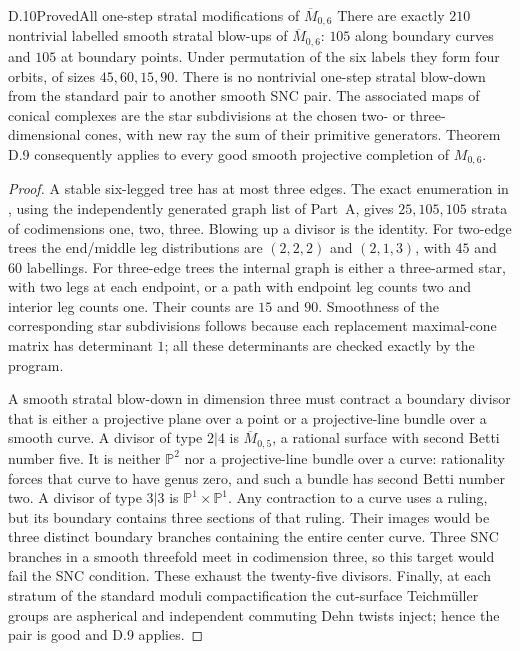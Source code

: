 \begin{result}{D.10}{Proved}{All one-step stratal modifications of $\overline M_{0,6}$}
There are exactly $210$ nontrivial labelled smooth stratal blow-ups of $\overline M_{0,6}$: $105$ along boundary curves and $105$ at boundary points. Under permutation of the six labels they form four orbits, of sizes $45,60,15,90$. There is no nontrivial one-step stratal blow-down from the standard pair to another smooth SNC pair. The associated maps of conical complexes are the star subdivisions at the chosen two- or three-dimensional cones, with new ray the sum of their primitive generators. Theorem D.9 consequently applies to every good smooth projective completion of $M_{0,6}$.
\end{result}
\begin{proof}
A stable six-legged tree has at most three edges. The exact enumeration in , using the independently generated graph list of Part~A, gives $25,105,105$ strata of codimensions one, two, three. Blowing up a divisor is the identity. For two-edge trees the end/middle leg distributions are $(2,2,2)$ and $(2,1,3)$, with $45$ and $60$ labellings. For three-edge trees the internal graph is either a three-armed star, with two legs at each endpoint, or a path with endpoint leg counts two and interior leg counts one. Their counts are $15$ and $90$. Smoothness of the corresponding star subdivisions follows because each replacement maximal-cone matrix has determinant $1$; all these determinants are checked exactly by the program.

A smooth stratal blow-down in dimension three must contract a boundary divisor that is either a projective plane over a point or a projective-line bundle over a smooth curve. A divisor of type $2|4$ is $\overline M_{0,5}$, a rational surface with second Betti number five. It is neither $\mathbb P^2$ nor a projective-line bundle over a curve: rationality forces that curve to have genus zero, and such a bundle has second Betti number two. A divisor of type $3|3$ is $\mathbb P^1\times\mathbb P^1$. Any contraction to a curve uses a ruling, but its boundary contains three sections of that ruling. Their images would be three distinct boundary branches containing the entire center curve. Three SNC branches in a smooth threefold meet in codimension three, so this target would fail the SNC condition. These exhaust the twenty-five divisors. Finally, at each stratum of the standard moduli compactification the cut-surface Teichm\"uller groups are aspherical and independent commuting Dehn twists inject; hence the pair is good and D.9 applies.
\end{proof}
